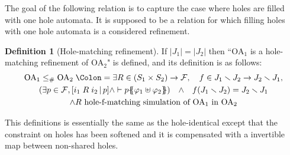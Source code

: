 \documentclass{article}
\theoremstyle{plain}
\theoremstyle{definition}
\newtheorem{defi}{Definition}
\newcommand\mpar[1]{{\left(#1\right)}}
\newcommand\mbrk[1]{{\left[#1\right]}}
\newcommand\mbrc[1]{{\left\{#1\right\}}}
\newcommand\card[1]{{\left|#1\right|}}
\newcommand\psubst[1]{\mbrc{\!\!\mbrc{#1}\!\!}}
\newcommand\midbar{\,\middle|\,}
\newcommand\prel[4]{\mbrk{#2\mathrel{#1}#3\midbar #4}}
\newcommand\defnotation{\DOTSB\;{\Colon=}\;}
\newcommand\qwedge{\DOTSB\quad{\wedge}\quad}
\newcommand\fformulae[1]{{\mathcal{F}}}
\begin{document}
The goal of the following relation is to capture the case where holes are filled with one hole automata.
It is supposed to be a relation for which filling holes with one hole automata is a considered refinement.
\begin{defi}[Hole-matching refinement]
If \(\card{J_1} = \card{J_2}\) then ``\(\mathrm{OA}_1\) is a hole-matching refinement of \(\mathrm{OA}_2\)" is defined, and its definition is as follows:
\begin{multline*}
	\mathrm{OA}_1 \leq_\# \mathrm{OA}_2 \defnotation \exists R \in \mpar{S_1 \times S_2} \to \fformulae{E}, \quad f \in J_1 \setminus J_2 \to J_2 \setminus J_1, \\
	\mpar{\exists p \in \fformulae{E}, \prel{R}{i_1}{i_2}{p} \wedge \vdash p\psubst{\varphi_1 \uplus \varphi_2}} \qwedge f\mpar{J_1 \setminus J_2} = J_2 \setminus J_1 \\
	\wedge R \text{ hole-f-matching simulation of } \mathrm{OA}_1 \text{ in } \mathrm{OA}_2
\end{multline*}
\end{defi}
This definitions is essentially the same as the hole-identical except that the constraint on holes has been softened and it is compensated with a invertible map between non-shared holes.
\end{document}
